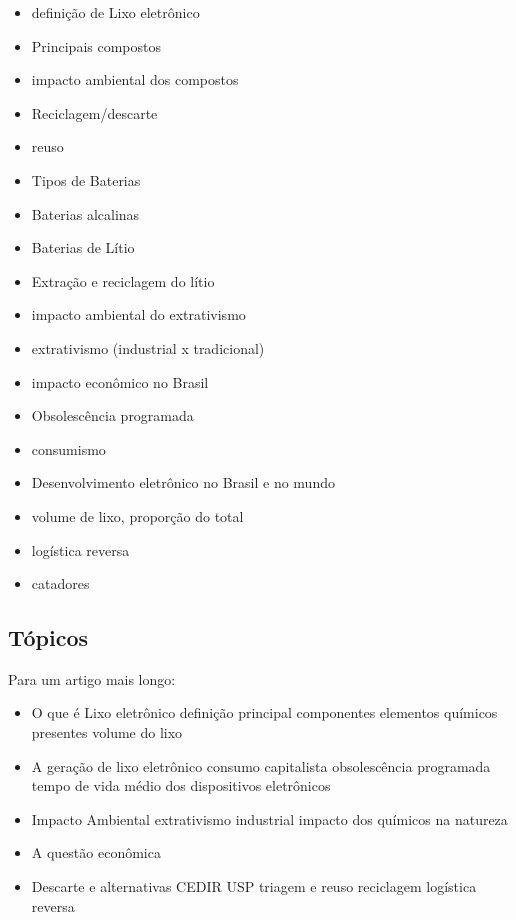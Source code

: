 \documentclass[
	article,			%
	11pt,				%
	oneside,			%
	a4paper,			%
	english,			%
	brazil,				%
	sumario=tradicional
	]{abntex2}
\begin{document}
\begin{itemize}
   \item definição de Lixo eletrônico
   \item Principais compostos
   \item impacto ambiental dos compostos
   \item Reciclagem/descarte
   \item reuso
   \item Tipos de Baterias
   \item Baterias alcalinas
   \item Baterias de Lítio
   \item Extração e reciclagem do lítio
   \item impacto ambiental do extrativismo
   \item extrativismo (industrial x tradicional)
   \item impacto econômico no Brasil
   \item Obsolescência programada
   \item consumismo
   \item Desenvolvimento eletrônico no Brasil e no mundo
   \item volume de lixo, proporção do total
   \item logística reversa
   \item catadores
\end{itemize}

\subsection{Tópicos}

Para um artigo mais longo:

\begin{itemize}
	\item O que é Lixo eletrônico
	\subitem definição 
	\subitem principal componentes
	\subitem elementos químicos presentes
	\subitem volume do lixo
	\item A geração de lixo eletrônico
	\subitem consumo capitalista
	\subitem obsolescência programada
	\subitem tempo de vida médio dos dispositivos eletrônicos
	\item Impacto Ambiental
	\subitem extrativismo industrial
	\subitem impacto dos químicos na natureza
	\item A questão econômica
	\item Descarte e alternativas
	\subitem CEDIR USP
	\subitem triagem e reuso
	\subitem reciclagem
	\subitem logística reversa
\end{itemize}
\end{document}
